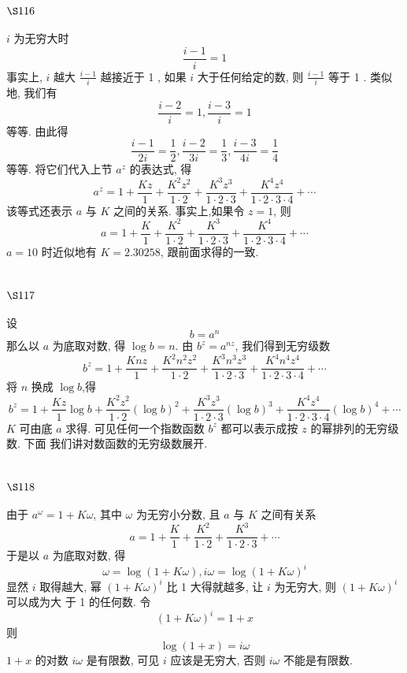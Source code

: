 \section{$\S 116$}

$i$ 为无穷大时
\[
\frac{i-1}{i}=1
\]
事实上, $i$ 越大 $\frac{i-1}{i}$ 越接近于 1 , 如果 $i$ 大于任何给定的数, 则 $\frac{i-1}{i}$ 等于 1 . 类似地, 我们有
\[
\frac{i-2}{i}=1, \frac{i-3}{i}=1
\]
等等. 由此得
\[
\frac{i-1}{2 i}=\frac{1}{2}, \frac{i-2}{3 i}=\frac{1}{3}, \frac{i-3}{4 i}=\frac{1}{4}
\]
等等. 将它们代入上节 $a^{z}$ 的表达式, 得
\[
a^{z}=1+\frac{K z}{1}+\frac{K^{2} z^{2}}{1 \cdot 2}+\frac{K^{3} z^{3}}{1 \cdot 2 \cdot 3}+\frac{K^{4} z^{4}}{1 \cdot 2 \cdot 3 \cdot 4}+\cdots
\]
该等式还表示 $a$ 与 $K$ 之间的关系. 事实上,如果令 $z=1$, 则
\[
a=1+\frac{K}{1}+\frac{K^{2}}{1 \cdot 2}+\frac{K^{3}}{1 \cdot 2 \cdot 3}+\frac{K^{4}}{1 \cdot 2 \cdot 3 \cdot 4}+\cdots
\]
$a=10$ 时近似地有 $K=2.30258$, 跟前面求得的一致.

\section{$\S 117$}

设
\[
b=a^{n}
\]
那么以 $a$ 为底取对数, 得 $\log b=n$. 由 $b^{z}=a^{n z}$, 我们得到无穷级数
\[
b^{z}=1+\frac{K n z}{1}+\frac{K^{2} n^{2} z^{2}}{1 \cdot 2}+\frac{K^{3} n^{3} z^{3}}{1 \cdot 2 \cdot 3}+\frac{K^{4} n^{4} z^{4}}{1 \cdot 2 \cdot 3 \cdot 4}+\cdots
\]
将 $n$ 换成 $\log b$,得
\[
b^{z}=1+\frac{K z}{1} \log b+\frac{K^{2} z^{2}}{1 \cdot 2}(\log b)^{2}+\frac{K^{3} z^{3}}{1 \cdot 2 \cdot 3}(\log b)^{3}+\frac{K^{4} z^{4}}{1 \cdot 2 \cdot 3 \cdot 4}(\log b)^{4}+\cdots
\]
$K$ 可由底 $a$ 求得. 可见任何一个指数函数 $b^{z}$ 都可以表示成按 $z$ 的幂排列的无穷级数. 下面 我们讲对数函数的无穷级数展开.

\section{$\S 118$}

由于 $a^{\omega}=1+K \omega$, 其中 $\omega$ 为无穷小分数, 且 $a$ 与 $K$ 之间有关系
\[
a=1+\frac{K}{1}+\frac{K^{2}}{1 \cdot 2}+\frac{K^{3}}{1 \cdot 2 \cdot 3}+\cdots
\]
于是以 $a$ 为底取对数, 得
\[
\omega=\log (1+K \omega), i \omega=\log (1+K \omega)^{i}
\]
显然 $i$ 取得越大, 幂 $(1+K \omega)^{i}$ 比 1 大得就越多, 让 $i$ 为无穷大, 则 $(1+K \omega)^{i}$ 可以成为大 于 1 的任何数. 令
\[
(1+K \omega)^{i}=1+x
\]
则
\[
\log (1+x)=i \omega
\]
$1+x$ 的对数 $i \omega$ 是有限数, 可见 $i$ 应该是无穷大, 否则 $i \omega$ 不能是有限数.

